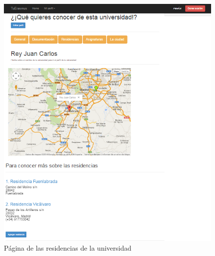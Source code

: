 \begin{figure}[htbp]
	
	\centering
	\includegraphics[scale=0.5]{./Figuras/tuerasmusPages/privatePages/uniResidencias.png}
	\caption{P\'agina de las residencias de la universidad}
	\label{fig:uniR}
	
\end{figure}
